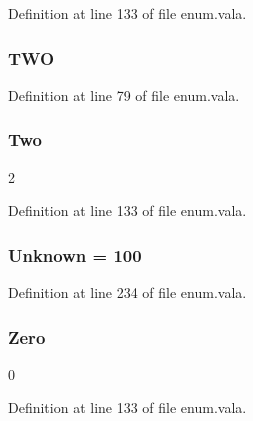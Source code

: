 Definition at line 133 of file enum.\-vala.

\hypertarget{enum_8vala_a0673b633b0851b14ed38bd96f5781290}{
\subsubsection[{T\-W\-O}]{\setlength{\rightskip}{0pt plus 5cm}T\-W\-O}}\label{enum_8vala_a0673b633b0851b14ed38bd96f5781290}


Definition at line 79 of file enum.\-vala.

\hypertarget{enum_8vala_ae1ebba61750a87cd3e04f7a0bcc54d41}{
\subsubsection[{Two}]{\setlength{\rightskip}{0pt plus 5cm}Two}}\label{enum_8vala_ae1ebba61750a87cd3e04f7a0bcc54d41}
2 

Definition at line 133 of file enum.\-vala.

\hypertarget{enum_8vala_a915d220aba4527d1e33010bdfcbc6855}{
\subsubsection[{Unknown}]{\setlength{\rightskip}{0pt plus 5cm}Unknown = 100}}\label{enum_8vala_a915d220aba4527d1e33010bdfcbc6855}


Definition at line 234 of file enum.\-vala.

\hypertarget{enum_8vala_ab7be4097d881eae846c441069ed51f24}{
\subsubsection[{Zero}]{\setlength{\rightskip}{0pt plus 5cm}Zero}}\label{enum_8vala_ab7be4097d881eae846c441069ed51f24}
0 

Definition at line 133 of file enum.\-vala.

